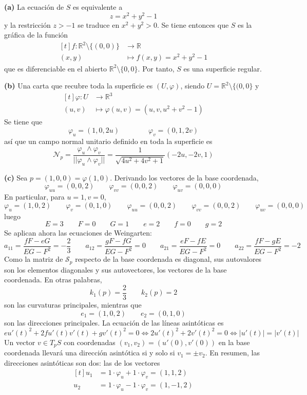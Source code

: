 \documentclass[12pt]{report}
\newcommand{\R}{\mathbb R}
\begin{document}
\vspace{2mm}
\textbf{(a)} La ecuación de $S$ es equivalente a
\[z = x^2+y^2-1\]
y la restricción $z>-1$ se traduce en $x^2+y^2>0$. Se tiene entonces que $S$ es la gráfica de la función
\[
\begin{aligned}[t]
    f \colon \R^2 \setminus \{(0,0)\} &\longrightarrow \R \\
    (x,y) &\longmapsto f(x,y) = x^2+y^2-1
\end{aligned}
\]
que es diferenciable en el abierto $\R^2 \setminus \{0,0\}$. Por tanto, $S$ es una superficie regular.

\vspace{2mm}
\textbf{(b)} Una carta que recubre toda la superficie es $(U,\varphi)$, siendo $U = \R^2 \setminus \{(0,0\}$ y
\[
\begin{aligned}[t]
\varphi \colon U &\longrightarrow \R^3 \\
(u,v) &\longmapsto \varphi(u,v) = (u,v,u^2+v^2-1)
\end{aligned}\]
Se tiene que
\[\varphi_u = (1,0,2u) \qquad \qquad \varphi_v = (0,1,2v)\]
así que un campo normal unitario definido en toda la superficie es
\[\mathcal{N}_p = \frac{\varphi_u \wedge \varphi_v}{||\varphi_u \wedge \varphi_v||} = \frac{1}{\sqrt{4u^2+4v^2+1}}(-2u,-2v,1)\]

\vspace{2mm}
\textbf{(c) } Sea $p = (1,0,0) = \varphi(1,0)$. Derivando los vectores de la base coordenada,
\[\varphi_{uu} = (0,0,2) \qquad \varphi_{vv} = (0,0,2) \qquad \varphi_{uv} = (0,0,0)\]
En particular, para $u = 1, v = 0$,
\[\varphi_u = (1,0,2) \qquad \varphi_v = (0,1,0) \qquad \varphi_{uu} = (0,0,2) \qquad \varphi_{vv} = (0,0,2) \qquad \varphi_{uv} = (0,0,0)\]
luego
\[E = 3 \qquad F = 0 \qquad G = 1 \qquad e = 2 \qquad f = 0 \qquad g = 2\]
Se aplican ahora las ecuaciones de Weingarten:
\[
a_{11} = \frac{fF-eG}{EG-F^2} = -\frac{2}{3} \qquad
a_{12} = \frac{gF-fG}{EG-F^2} = 0 \qquad
a_{21} = \frac{eF-fE}{EG-F^2} = 0 \qquad
a_{22} = \frac{fF-gE}{EG-F^2} = -2
\]
Como la matriz de $\mathcal{S}_p$ respecto de la base coordenada es diagonal, sus autovalores son los elementos diagonales y sus autovectores, los vectores de la base coordenada. En otras palabras,
\[k_1(p) = \frac{2}{3} \qquad k_2(p) = 2\]
son las curvaturas principales, mientras que
\[e_1 = (1,0,2) \qquad e_2 = (0,1,0)\]
son las direcciones principales. La ecuación de las líneas asintóticas es
\[eu'(t)^2+2fu'(t)v'(t)+gv'(t)^2 = 0 \iff 2u'(t)^2+2v'(t)^2 = 0 \iff |u'(t)| = |v'(t)|\]
Un vector $v \in T_pS$ con coordenadas $(v_1,v_2) = (u'(0),v'(0))$ en la base coordenada llevará una dirección asintótica si y solo si $v_1 = \pm v_2$. En resumen, las direcciones asintóticas son dos: las de los vectores
\[
\begin{aligned}[t]
u_1 &= 1 \cdot \varphi_u + 1 \cdot \varphi_v = (1,1,2) \\
u_2 &= 1 \cdot \varphi_u - 1 \cdot \varphi_v = (1,-1,2)
\end{aligned}\]
\end{document}
